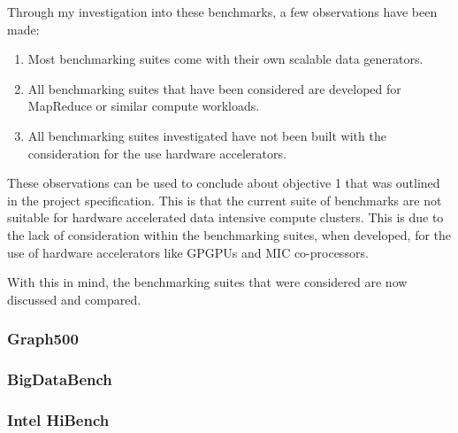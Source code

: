 \documentclass[12pt,a4paper]{article}
\begin{document}
            Through my investigation into these benchmarks, a few observations have been made:
            
            \begin{enumerate}
            \item Most benchmarking suites come with their own scalable data generators.
            \item All benchmarking suites that have been considered are developed for MapReduce or similar compute workloads.
            \item All benchmarking suites investigated have not been built with the consideration for the use hardware accelerators.
            \end{enumerate}
            
            These observations can be used to conclude about objective 1 that was outlined in the project specification. This is that the current suite of benchmarks are not suitable for hardware accelerated data intensive compute clusters. This is due to the lack of consideration within the benchmarking suites, when developed, for the use of hardware accelerators like GPGPUs and MIC co-processors.
            
            With this in mind, the benchmarking suites that were considered are now discussed and compared.
    
            \subsubsection{Graph500}
            \label{ssub:graph500}
            
                
            
        
            \subsubsection{BigDataBench}
            \label{ssub:bigdatabench}
            
            
            \subsubsection{Intel HiBench}
            \label{ssub:intel_hibench}
            
\end{document}
